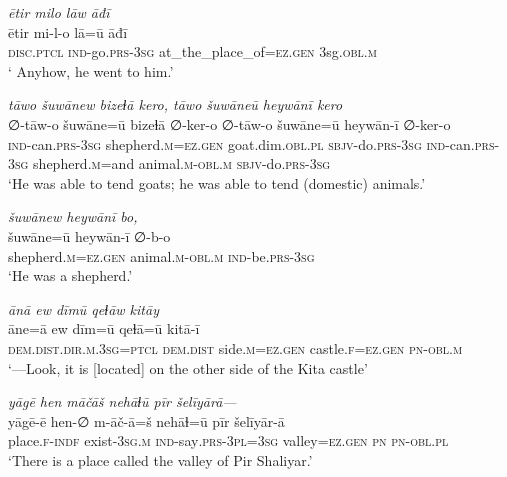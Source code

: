 \ea \label{ŽP.13}
\textit{ētir milo lāw āđī} \\ 
\gll ētir mi-l-o lā=ū āđī \\ 
 \textsc{disc.ptcl} \textsc{ind-}go\textsc{.prs}\textsc{-3sg} at\_the\_place\_of\textsc{\textsc{=ez.gen}} 3sg\textsc{.obl}\textsc{.m} \\ 
\glt ` Anyhow, he went to him.'
\z 
 
\ea \label{ŽP.16}
\textit{tāwo šuwānew bizeɫā kero, tāwo šuwāneū heywānī kero} \\ 
\gll ∅-tāw-o šuwāne=ū bizeɫā ∅-ker-o ∅-tāw-o šuwāne=ū heywān-ī ∅-ker-o \\ 
 \textsc{ind-}can\textsc{.prs}\textsc{-3sg} shepherd\textsc{.m}\textsc{\textsc{=ez.gen}} goat.dim\textsc{.obl}\textsc{.pl} \textsc{sbjv-}do\textsc{.prs}\textsc{-3sg} \textsc{ind-}can\textsc{.prs}\textsc{-3sg} shepherd\textsc{.m}=and animal\textsc{.m}\textsc{-obl}\textsc{.m} \textsc{sbjv-}do\textsc{.prs}\textsc{-3sg} \\ 
\glt `He was able to tend goats; he was able to tend (domestic) animals.'
\z 
 
\ea \label{ŽP.17}
\textit{šuwānew heywānī bo,} \\ 
\gll šuwāne=ū heywān-ī ∅-b-o \\ 
 shepherd\textsc{.m}\textsc{\textsc{=ez.gen}} animal\textsc{.m}\textsc{-obl}\textsc{.m} \textsc{ind-}be\textsc{.prs}\textsc{-3sg} \\ 
\glt `He was a shepherd.'
\z 
 
\ea \label{ŽP.19}
\textit{ānā ew dīmū qeɫāw kitāy} \\ 
\gll āne=ā ew dīm=ū qeɫā=ū kitā-ī \\ 
 \textsc{dem.dist}\textsc{.dir}\textsc{.m}\textsc{.3sg}=\textsc{ptcl} \textsc{dem.dist} side\textsc{.m}\textsc{\textsc{=ez.gen}} castle\textsc{.f}\textsc{\textsc{=ez.gen}} \textsc{pn}\textsc{-obl}\textsc{.m} \\ 
\glt `—Look, it is [located] on the other side of the Kita castle'
\z 
 
\ea \label{ŽP.20}
\textit{yāgē hen māčāš nehāɫū pīr šelīyārā—} \\ 
\gll yāgē-ē hen-∅ m-āč-ā=š nehāɫ=ū pīr šelīyār-ā \\ 
 place\textsc{.f}\textsc{-indf} exist\textsc{-3sg}\textsc{.m} \textsc{ind-}say\textsc{.prs}\textsc{-3pl}\textsc{=3sg} valley\textsc{\textsc{=ez.gen}} \textsc{pn} \textsc{pn}\textsc{-obl}\textsc{.pl} \\ 
\glt `There is a place called the valley of Pir Shaliyar.'
\z 
 
